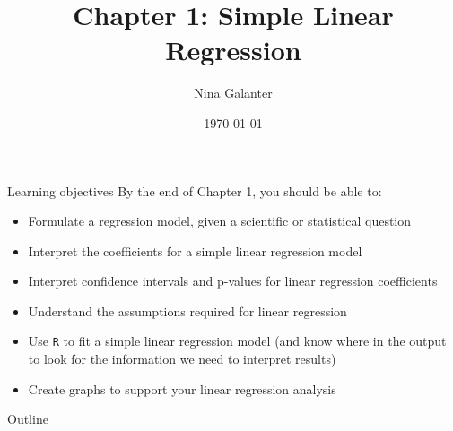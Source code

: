 \documentclass[10pt,t]{beamer}
\title{Chapter 1: Simple Linear Regression}
\author{Nina Galanter}
\date{\today}
\begin{document}
	\begin{frame}
	\titlepage 
\end{frame}

\begin{frame}{Learning objectives}
By the end of Chapter 1, you should be able to:
\begin{itemize}
	\item Formulate a regression model, given a scientific or statistical question
	\item Interpret the coefficients for a simple linear regression model
	\item Interpret confidence intervals and p-values for linear regression coefficients
	\item Understand the assumptions required for linear regression
	\item Use \texttt{R} to fit a simple linear regression model (and know where in the output to look for the information we need to interpret results)
	\item Create graphs to support your linear regression analysis
\end{itemize}
\end{frame}

\begin{frame}{Outline}
\tableofcontents
\end{frame}


\end{document}
